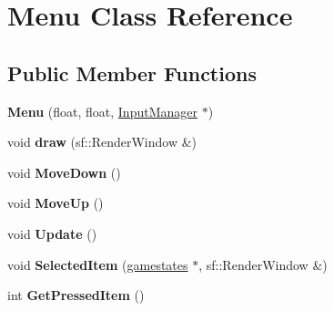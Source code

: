\hypertarget{class_menu}{}\section{Menu Class Reference}
\label{class_menu}
\subsection*{Public Member Functions}
\begin{DoxyCompactItemize}
\item 
\mbox{\label{class_menu_a03daa4b002ff9bc5377be91010018dc3}} 
{\bfseries Menu} (float, float, \hyperlink{class_input_manager}{Input\+Manager} $\ast$)
\item 
\mbox{\label{class_menu_a5c486201ec217b10588c145d043e4eb8}} 
void {\bfseries draw} (sf\+::\+Render\+Window \&)
\item 
\mbox{\label{class_menu_a804da9a381bb6c633d5d2bc4f839ec62}} 
void {\bfseries Move\+Down} ()
\item 
\mbox{\label{class_menu_acfb038bbd1050d6c55c86eec1f35dbdb}} 
void {\bfseries Move\+Up} ()
\item 
\mbox{\label{class_menu_af29d71473a414e31e914bc637840cb3e}} 
void {\bfseries Update} ()
\item 
\mbox{\label{class_menu_afc7321c7f8a218bd91cd380f138e8537}} 
void {\bfseries Selected\+Item} (\hyperlink{classgamestates}{gamestates} $\ast$, sf\+::\+Render\+Window \&)
\item 
\mbox{\label{class_menu_a81b2029bf7783f38be26000969e99e30}} 
int {\bfseries Get\+Pressed\+Item} ()
\end{DoxyCompactItemize}
